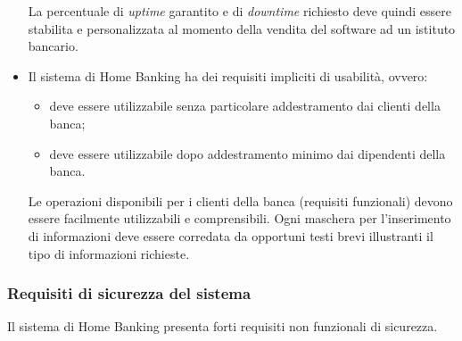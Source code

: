 \begin{itemize}
	La percentuale di \emph{uptime} garantito e di \emph{downtime} richiesto deve quindi essere stabilita e personalizzata al momento della vendita del software ad un istituto bancario.

	\item Il sistema di Home Banking ha dei requisiti impliciti di usabilit\`a, ovvero:
	\begin{itemize}
		\item deve essere utilizzabile senza particolare addestramento dai clienti della banca;
		\item deve essere utilizzabile dopo addestramento minimo dai dipendenti della banca.
	\end{itemize}
	Le operazioni disponibili per i clienti della banca (requisiti funzionali) devono essere facilmente utilizzabili e comprensibili.
	Ogni maschera per l'inserimento di informazioni deve essere corredata da opportuni testi brevi illustranti il tipo di informazioni richieste.
\end{itemize}

\subsubsection{Requisiti di sicurezza del sistema}

Il sistema di Home Banking presenta forti requisiti non funzionali di sicurezza.

